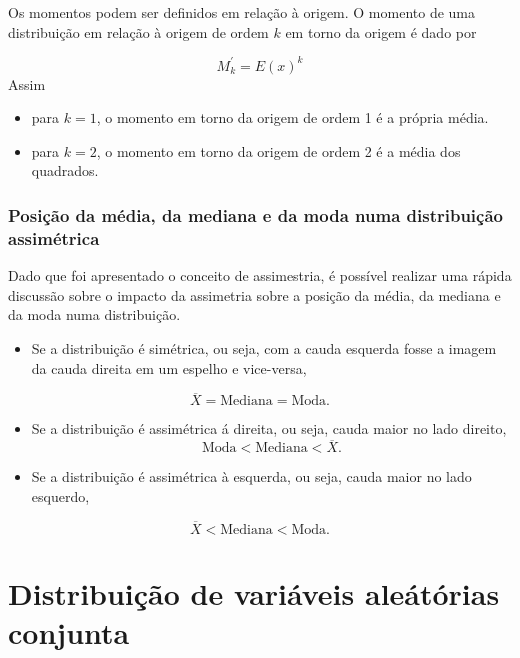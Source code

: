 \documentclass[
]{book}
\providecommand{\tightlist}{%
  \setlength{\itemsep}{0pt}\setlength{\parskip}{0pt}}
\begin{document}
Os momentos podem ser definidos em relação à origem. O momento de uma distribuição em relação à origem de ordem \(k\) em torno da origem é dado por

\[
  M_k^{'} = E(x)^k
\]
Assim

\begin{itemize}
\tightlist
\item
  para \(k=1\), o momento em torno da origem de ordem 1 é a própria média.
\item
  para \(k=2\), o momento em torno da origem de ordem 2 é a média dos quadrados.
\end{itemize}

\hypertarget{posiuxe7uxe3o-da-muxe9dia-da-mediana-e-da-moda-numa-distribuiuxe7uxe3o-assimuxe9trica}{%
\subsection{Posição da média, da mediana e da moda numa distribuição assimétrica}\label{posiuxe7uxe3o-da-muxe9dia-da-mediana-e-da-moda-numa-distribuiuxe7uxe3o-assimuxe9trica}}

Dado que foi apresentado o conceito de assimestria, é possível realizar uma rápida discussão sobre o impacto da assimetria sobre a posição da média, da mediana e da moda numa distribuição.

\begin{itemize}
\tightlist
\item
  Se a distribuição é simétrica, ou seja, com a cauda esquerda fosse a imagem da cauda direita em um espelho e vice-versa,
\end{itemize}

\[
  \overline{X} = \text{Mediana} = \text{Moda}.
\]

\begin{itemize}
\item
  Se a distribuição é assimétrica á direita, ou seja, cauda maior no lado direito,
  \[
   \text{Moda} < \text{Mediana} < \overline{X}.
  \]
\item
  Se a distribuição é assimétrica à esquerda, ou seja, cauda maior no lado esquerdo,
\end{itemize}

\[
  \overline{X} < \text{Mediana} < \text{Moda}.
\]

\hypertarget{distribuiuxe7uxe3o-de-variuxe1veis-aleuxe1tuxf3rias-conjunta}{%
\chapter{Distribuição de variáveis aleátórias conjunta}\label{distribuiuxe7uxe3o-de-variuxe1veis-aleuxe1tuxf3rias-conjunta}}
\end{document}
